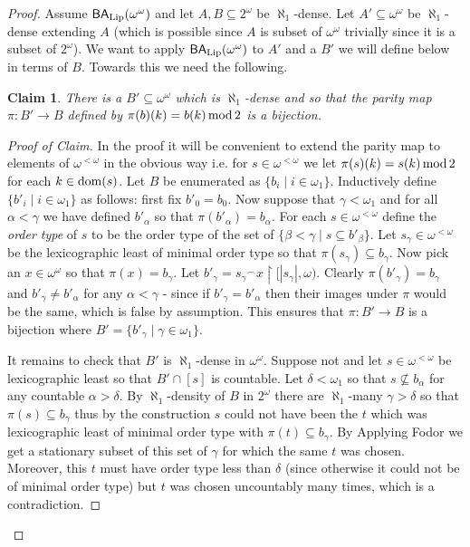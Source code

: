 \documentclass[leqno,11pt]{amsart}
\newtheorem{claim}[theorem]{Claim}
\theoremstyle{definition}
\theoremstyle{remark}
\def\hook{\upharpoonright}
\def\BA{\mathsf{BA}}
\def\baire{\omega^\omega}
\begin{document}
\begin{proof}
    Assume $\BA_{\rm Lip}(\baire)$ and let $A, B \subseteq 2^\omega$ be $\aleph_1$-dense. Let $A' \subseteq \baire$ be $\aleph_1$-dense extending $A$ (which is possible since $A$ is subset of $\baire$ trivially since it is a subset of $2^\omega$). We want to apply $\BA_{\rm Lip}(\baire)$ to $A'$ and a $B'$ we will define below in terms of $B$. Towards this we need the following.

    \begin{claim}
        There is a $B' \subseteq \baire$ which is $\aleph_1$-dense and so that the parity map $\pi:B' \to B$ defined by $\pi(b)(k) = b(k) \, {\rm mod} \, 2$ is a bijection.
    \end{claim}

    \begin{proof}[Proof of Claim]
        In the proof it will be convenient to extend the parity map to elements of $\omega^{<\omega}$ in the obvious way i.e. for $s \in \omega^{<\omega}$ we let $\pi(s) (k) = s(k) \, {\rm mod} \, 2$ for each $k \in {\rm dom}(s)$. Let $B$ be enumerated as $\{b_i\; | \; i \in \omega_1\}$. Inductively define $\{b'_i\; | \; i \in\omega_1\}$ as follows:  first fix $b'_0 = b_0$. Now suppose that $\gamma < \omega_1$ and for all $\alpha < \gamma$ we have defined $b'_\alpha$ so that $\pi (b'_\alpha) = b_\alpha$. For each $s \in \omega^{<\omega}$ define the {\em order type} of $s$ to be the order type of the set of $\{\beta < \gamma\; | \; s \subseteq b'_\beta\}$. Let $s_\gamma \in \omega^{<\omega}$ be the lexicographic least of minimal order type so that $\pi(s_\gamma) \subseteq b_\gamma$. Now pick an $x \in \baire$ so that $\pi (x) = b_\gamma$. Let $b'_\gamma = s_\gamma {}^\frown x \hook [|s_\gamma|, \omega)$. Clearly $\pi (b'_\gamma) = b_\gamma$ and $b'_\gamma \neq b'_\alpha$ for any $\alpha < \gamma$ - since if $b'_\gamma = b'_\alpha$ then their images under $\pi$ would be the same, which is false by assumption. This ensures that $\pi:B' \to B$ is a bijection where $B' = \{b'_\gamma \; | \; \gamma \in \omega_1\}$. 

        It remains to check that $B'$ is $\aleph_1$-dense in $\baire$. Suppose not and let $s \in \omega^{<\omega}$ be lexicographic least so that $B' \cap [s]$ is countable. Let $\delta < \omega_1$ so that $s \nsubseteq b_\alpha$ for any countable $\alpha > \delta$. By $\aleph_1$-density of $B$ in $2^\omega$ there are $\aleph_1$-many $\gamma > \delta$ so that $\pi (s) \subseteq b_\gamma$ thus by the construction $s$ could not have been the $t$ which was lexicographic least of minimal order type with $\pi (t) \subseteq b_\gamma$. By Applying Fodor we get a stationary subset of this set of $\gamma$ for which the same $t$ was chosen. Moreover, this $t$ must have order type less than $\delta$ (since otherwise it could not be of minimal order type) but $t$ was chosen uncountably many times, which is a contradiction. 
        

\end{proof}
\end{proof}
\end{document}
